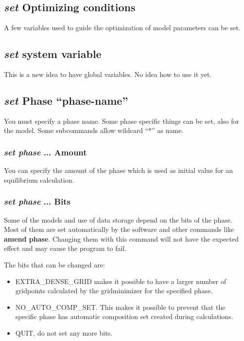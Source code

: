 \documentclass[11pt]{article}
\begin{document}
\subsection{{\em set} Optimizing conditions}

A few variables used to guide the optimization of model parameters can
be set.

\hypertarget{Set system variable}{}
\subsection{{\em set} system variable}

This is a new idea to have global variables.  No idea how to use it
yet.

\hypertarget{Set phase}{}
\hypertarget{Set for phase}{}
\subsection{{\em set} Phase ``phase-name''}

You must specify a phase name.  Some phase specific things can be set,
also for the model.  Some subcommands allow wildcard ``*'' as name.

\hypertarget{Set phase amount}{}
\subsubsection{{\em set phase} ... Amount}

You can specify the amount of the phase which is used as initial value
for an equilibrium calculation.

\hypertarget{Set phase bits}{}
\subsubsection{{\em set phase} ... Bits}

Some of the models and use of data storage depend on the bits of the
phase.  Most of them are set automatically by the software and other
commands like {\bf amend phase}.  Changing them with this command will not
have the expected effect and may cause the program to fail.

The bits that can be changed are:

\hypertarget{Extra-dense-grid}{}
\begin{itemize}
\item EXTRA\_DENSE\_GRID makes it possible to have a larger number of
  gridpoints calculated by the gridminimizer for the specified phase.

\hypertarget{No-auto-comp-set}{}
\item NO\_AUTO\_COMP\_SET.  This makes it possible to prevent that the
specific phase has automatic composition set created during
calculations.

\hypertarget{Set bit quit}{}
\item QUIT, do not set any more bits.
\end{itemize}
\end{document}

